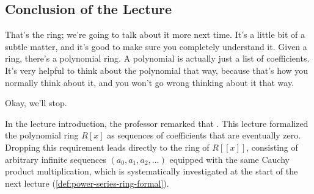 \subsection{Conclusion of the Lecture}

\begin{speech}[01:29:40 - 01:30:00]
That's the ring; we're going to talk about it more next time. It's a little bit of a subtle matter, and it's good to make sure you completely understand it. Given a ring, there's a polynomial ring. A polynomial is actually just a list of coefficients. It's very helpful to think about the polynomial that way, because that's how you normally think about it, and you won't go wrong thinking about it that way.

Okay, we'll stop. 
\end{speech}

\begin{aiNote}
In the lecture introduction, the professor remarked that . This lecture formalized the polynomial ring $R[x]$ as sequences of coefficients that are eventually zero. Dropping this requirement leads directly to the ring of  $R[[x]]$, consisting of arbitrary infinite sequences $(a_0, a_1, a_2, \dots)$ equipped with the same Cauchy product multiplication, which is systematically investigated at the start of the next lecture (\cref{def:power-series-ring-formal}).
\end{aiNote}

